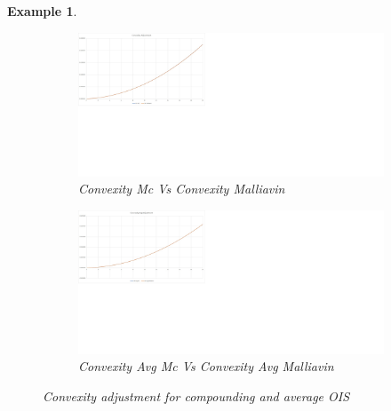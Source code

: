 \documentclass[a4paper,10pt]{article}
\newtheorem{example}[theorem]{Example}
\newcommand{\1}{\mathbf{1}}
\begin{document}
\begin{example}
\begin{figure}
\begin{subfigure}{.5\textwidth}
  \centering
  \includegraphics[scale=0.2]{Figures/convexity_ois.jpg}
		\caption{Convexity Mc Vs Convexity Malliavin}
\end{subfigure}
\begin{subfigure}{.5\textwidth}
  \centering
  \includegraphics[scale=0.2]{Figures/convexity_avg_ois.jpg}
		\caption{Convexity Avg Mc Vs Convexity Avg Malliavin}
\end{subfigure}
\caption{Convexity adjustment for compounding and average OIS}
\end{figure} 
\end{example}

\newpage
\end{document}
